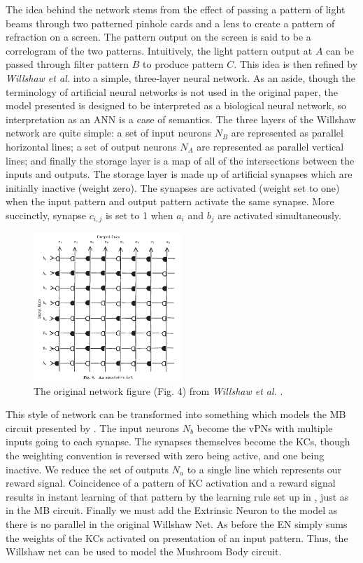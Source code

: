 \documentclass[a4paper,12pt]{article}
\begin{document}
The idea behind the network stems from the effect of passing a pattern of light beams through two
patterned pinhole cards and a lens to create a pattern of refraction on a screen. The pattern output
on the screen is said to be a correlogram of the two patterns. Intuitively, the light pattern output
at $A$ can be passed through filter pattern $B$ to produce pattern $C$. This idea is then refined by
\textit{Willshaw et al.} into a simple, three-layer neural network. As an aside, though the terminology of artificial
neural networks is not used in the original paper, the model presented is designed to be interpreted as
a biological neural network, so interpretation as an ANN is a case of semantics. The three layers of the
Willshaw network are quite simple: a set of input neurons $N_B$ are represented as parallel horizontal
lines; a set of output neurons $N_A$ are represented as parallel vertical lines; and finally the storage
layer is a map of all of the intersections between the inputs and outputs. The storage layer is made up of
artificial synapses which are initially inactive (weight zero). The synapses are activated (weight set to one)
when the input pattern and output pattern activate the same synapse. More succinctly, synapse $c_{i,j}$ is set
to 1 when $a_i$ and $b_j$ are activated simultaneously.

\begin{figure}[h]
 
  \centering
  \includegraphics[width=0.5\textwidth]{Willshaw1969Model}
  \caption{
    \label{fig:willshawnet} The original network figure (Fig. 4) from \textit{Willshaw et al.} \cite{Willshaw1969}.
  }
 
\end{figure}

This style of network can be transformed into something which models the MB circuit presented by \cite{Ardin2016}.
The input neurons $N_b$ become the vPNs with multiple inputs going to each synapse. The synapses themselves become the
KCs, though the weighting convention is reversed with zero being active, and one being inactive. We reduce the set of
outputs $N_a$ to a single line which represents our reward signal. Coincidence of a pattern of KC activation and a reward
signal results in instant learning of that pattern by the learning rule set up in \cite{Willshaw1969},
just as in the MB circuit. Finally we must add the Extrinsic Neuron to
the model as there is no parallel in the original Willshaw Net. As before the EN simply sums the weights of the KCs activated
on presentation of an input pattern. Thus, the Willshaw net can be used to model the Mushroom Body circuit.
\newpage
\end{document}
